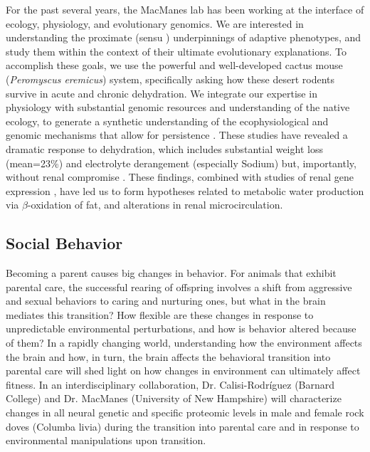 \documentclass[10.5pt]{article}
\newcommand{\per}{\textit{Peromyscus eremicus}}
\begin{document}
{For the past several years, the MacManes lab has been working at the interface of ecology, physiology, and evolutionary genomics. We are interested in understanding the proximate (sensu \citet{Tinbergen:1963ty}) underpinnings of adaptive phenotypes, and study them within the context of their ultimate evolutionary explanations. To accomplish these goals, we use the powerful and well-developed cactus mouse (\per) system, specifically asking how these desert rodents survive in acute and chronic dehydration. We integrate our expertise in physiology with substantial genomic resources and understanding of the native ecology, to generate a synthetic understanding of the ecophysiological and genomic mechanisms that allow for persistence \citep{MacManes:2017bu,Kordonowy:2017jk,Kordonowy:2016fq,MacManes:2014br}. These studies have revealed a dramatic response to dehydration, which includes substantial weight loss (mean=23\%) and electrolyte derangement (especially Sodium) but, importantly, without renal compromise \citep{MacManes:2017bu}. These findings, combined with studies of renal gene expression \citep{MacManes:2017bu}, have led us to form hypotheses related to metabolic water production via $\beta$-oxidation of fat, and alterations in renal microcirculation. \\

\subsection*{Social Behavior}


\noindent
Becoming a parent causes big changes in behavior. For animals that exhibit parental care, the successful rearing of offspring involves a shift from aggressive and sexual behaviors to caring and nurturing ones, but what in the brain mediates this transition? How flexible are these changes in response to unpredictable environmental perturbations, and how is behavior altered because of them? In a rapidly changing world, understanding how the environment affects the brain and how, in turn, the brain affects the behavioral transition into parental care will shed light on how changes in environment can ultimately affect fitness. In an interdisciplinary collaboration, Dr. Calisi-Rodríguez (Barnard College) and Dr. MacManes (University of New Hampshire) will characterize changes in all neural genetic and specific proteomic levels in male and female rock doves (Columba livia) during the transition into parental care and in response to environmental manipulations upon transition.  \\

}
\end{document}
